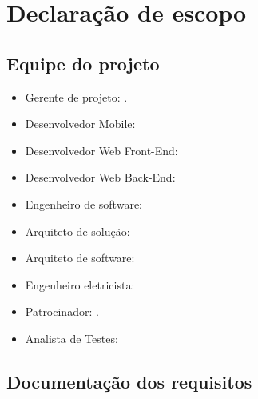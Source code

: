 
\chapter{Declaração de escopo}

\section{Equipe do projeto}

\begin{itemize}
	\item Gerente de projeto: \projectManagerName.
	\item Desenvolvedor Mobile:
	\item Desenvolvedor Web Front-End:
	\item Desenvolvedor Web Back-End:
	\item Engenheiro de software:
	\item Arquiteto de solução:
	\item Arquiteto de software:
	\item Engenheiro eletricista:
	\item Patrocinador: \projectSponsorName.
	\item Analista de Testes:
\end{itemize}


\section{Documentação dos requisitos}


